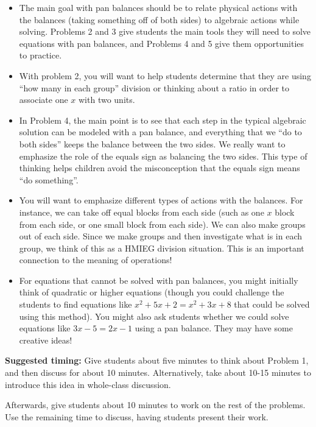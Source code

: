 \documentclass[nooutcomes,noauthor]{ximera}
\begin{document}
\begin{instructorNotes}
\begin{itemize}
	\item The main goal with pan balances should be to relate physical actions with the balances (taking something off of both sides) to algebraic actions while solving. Problems 2 and 3 give students the main tools they will need to solve equations with pan balances, and Problems 4 and 5 give them opportunities to practice.
	\item With problem 2, you will want to help students determine that they are using ``how many in each group'' division or thinking about a ratio in order to associate one $x$ with two units.
	\item In Problem 4, the main point is to see that each step in the typical algebraic solution can be modeled with a pan balance, and everything that we ``do to both sides'' keeps the balance between the two sides. We really want to emphasize the role of the equals sign as balancing the two sides. This type of thinking helps children avoid the misconception that the equals sign means ``do something''.
	\item You will want to emphasize different types of actions with the balances. For instance, we can take off equal blocks from each side (such as one $x$ block from each side, or one small block from each side). We can also make groups out of each side. Since we make groups and then investigate what is in each group, we think of this as a HMIEG division situation. This is an important connection to the meaning of operations!
	\item For equations that cannot be solved with pan balances, you might initially think of quadratic or higher equations (though you could challenge the students to find equations like $x^2 + 5x + 2 = x^2 + 3x + 8$ that could be solved using this method). You might also ask students whether we could solve equations like $3x - 5 = 2x - 1$ using a pan balance. They may have some creative ideas!
\end{itemize}





{\bf Suggested timing:} Give students about five minutes to think about Problem 1, and then discuss for about 10 minutes. Alternatively, take about 10-15 minutes to introduce this idea in whole-class discussion.

Afterwards, give students about 10 minutes to work on the rest of the problems. Use the remaining time to discuss, having students present their work.

\end{instructorNotes}
\end{document}
